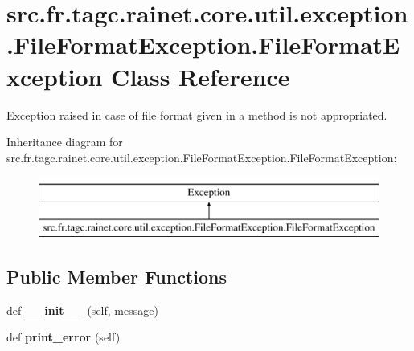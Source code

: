 \hypertarget{classsrc_1_1fr_1_1tagc_1_1rainet_1_1core_1_1util_1_1exception_1_1FileFormatException_1_1FileFormatException}{}\section{src.\+fr.\+tagc.\+rainet.\+core.\+util.\+exception.\+File\+Format\+Exception.\+File\+Format\+Exception Class Reference}
\label{classsrc_1_1fr_1_1tagc_1_1rainet_1_1core_1_1util_1_1exception_1_1FileFormatException_1_1FileFormatException}


Exception raised in case of file format given in a method is not appropriated.  


Inheritance diagram for src.\+fr.\+tagc.\+rainet.\+core.\+util.\+exception.\+File\+Format\+Exception.\+File\+Format\+Exception\+:\begin{figure}[H]
\begin{center}
\leavevmode
\includegraphics[height=2.000000cm]{classsrc_1_1fr_1_1tagc_1_1rainet_1_1core_1_1util_1_1exception_1_1FileFormatException_1_1FileFormatException}
\end{center}
\end{figure}
\subsection*{Public Member Functions}
\begin{DoxyCompactItemize}
\item 
\hypertarget{classsrc_1_1fr_1_1tagc_1_1rainet_1_1core_1_1util_1_1exception_1_1FileFormatException_1_1FileFormatException_a374b2a767ff7e33a4a67a6a751d29728}{}def {\bfseries \+\_\+\+\_\+init\+\_\+\+\_\+} (self, message)\label{classsrc_1_1fr_1_1tagc_1_1rainet_1_1core_1_1util_1_1exception_1_1FileFormatException_1_1FileFormatException_a374b2a767ff7e33a4a67a6a751d29728}

\item 
\hypertarget{classsrc_1_1fr_1_1tagc_1_1rainet_1_1core_1_1util_1_1exception_1_1FileFormatException_1_1FileFormatException_a6f6abefd1172772bc5c3909c596f4758}{}def {\bfseries print\+\_\+error} (self)\label{classsrc_1_1fr_1_1tagc_1_1rainet_1_1core_1_1util_1_1exception_1_1FileFormatException_1_1FileFormatException_a6f6abefd1172772bc5c3909c596f4758}

\end{DoxyCompactItemize}

